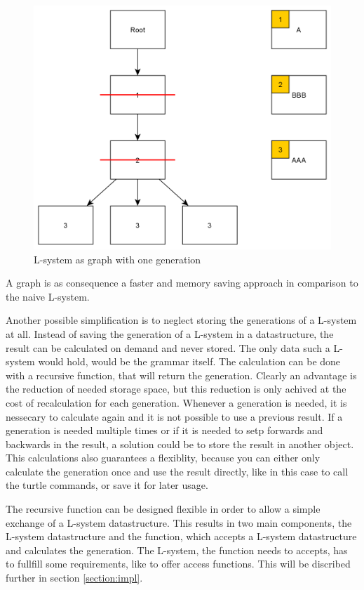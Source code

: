 \documentclass[english]{cpp-hmwk}
\begin{document}
\begin{figure}[h!]
	\centering
	\includegraphics[width=0.8\columnwidth]{../graphs/LSystem/examples/lsystem_graph_reduced2_example.png}
	\caption{L-system as graph with one generation}
	\label{figure:lsystem_graph_one_generation}
\end{figure}

\medskip
\noindent A graph is as consequence a faster and memory saving approach in comparison to the naive L-system.

\bigskip

\noindent Another possible simplification is to neglect storing the generations of a L-system at all. Instead of saving the generation of a L-system in a datastructure, the result can be calculated on demand and never stored. The only data such a L-system would hold, would be the grammar itself. The calculation can be done with a recursive function, that will return the generation. Clearly an advantage is the reduction of needed storage space, but this reduction is only achived at the cost of recalculation for each generation. Whenever a generation is needed, it is nessecary to calculate again and it is not possible to use a previous result.
If a generation is needed multiple times or if it is needed to setp forwards and backwards in the result, a solution could be to store the result in another object. This calculations also guarantees a flexiblity, because you can either only calculate the generation once and use the result directly, like in this case to call the turtle commands, or save it for later usage.
 
The recursive function can be designed flexible in order to allow a simple exchange of a L-system datastructure. This results in two main components, the L-system datastructure and the function, which accepts a L-system datastructure and calculates the generation. The L-system, the function needs to accepts, has to fullfill some requirements, like to offer access functions. This will be discribed further in section \ref{section:impl}.
 
\end{document}
